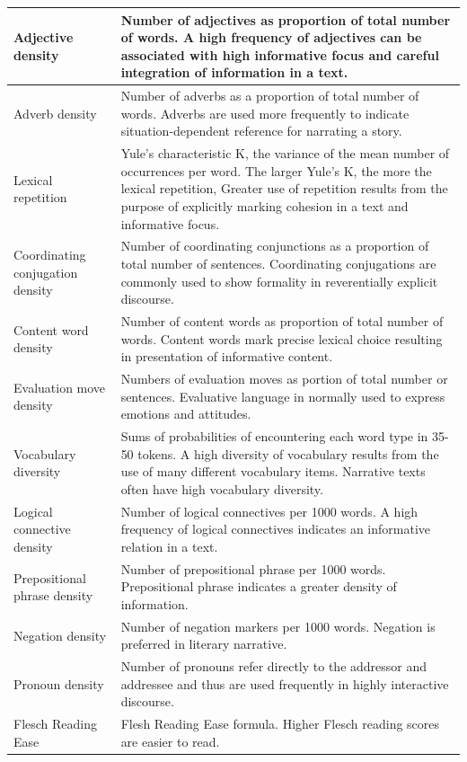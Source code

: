 \begin{table}[t]
\begin{tabular}{p{2cm}p{12cm}}
        \hline
        Adjective density & Number of adjectives as proportion of total number of words. A high frequency of adjectives can be associated with high informative focus and careful integration of information in a text. \\
        \hline
        Adverb density & Number of adverbs as a proportion of total number of words. Adverbs are used more frequently to indicate situation-dependent reference for narrating a story. \\
        \hline
        Lexical repetition & Yule's characteristic K, the variance of the mean number of occurrences per word. The larger Yule's K, the more the lexical repetition, Greater use of repetition results from the purpose of explicitly marking cohesion in a text and informative focus.  \\
        \hline
        Coordinating conjugation density & Number of coordinating conjunctions as a proportion of total number of sentences. Coordinating conjugations are commonly used to show formality in reverentially explicit discourse.  \\
        \hline
        Content word density & Number of content words as proportion of total number of words. Content words mark precise lexical choice resulting in presentation of informative content.\\
        \hline
        Evaluation move density & Numbers of evaluation moves as portion of total number or sentences. Evaluative language in normally used to express emotions and attitudes.  \\
        \hline
        Vocabulary diversity & Sums of probabilities of encountering each word type in 35-50 tokens. A high diversity of vocabulary results from the use of many different vocabulary items. Narrative texts often have high vocabulary diversity.  \\
        \hline
        Logical connective density & Number of logical connectives per 1000 words. A high frequency of logical connectives indicates an informative relation in a text.  \\
        \hline
        Prepositional phrase density & Number of prepositional phrase per 1000 words. Prepositional phrase indicates a greater density of information.  \\
        \hline
        Negation density & Number of negation markers per 1000 words. Negation is preferred in literary narrative.  \\
        \hline
        Pronoun density & Number of pronouns refer directly to the addressor and addressee and thus are used frequently in highly interactive discourse. \\
        \hline
        Flesch Reading Ease & Flesh Reading Ease formula. Higher Flesch reading scores are easier to read.  \\
  		\hline
	\end{tabular}
\end{table}

